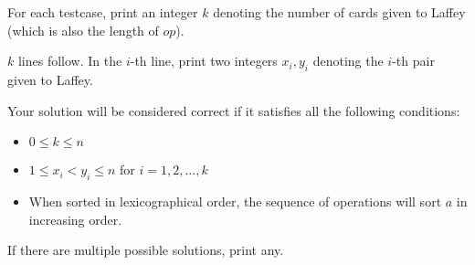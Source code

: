 For each testcase, print an integer $k$ denoting the number of cards given to Laffey (which is also the length of $op$).

$k$ lines follow.
In the $i$-th line, print two integers $x_i,y_i$ denoting the $i$-th pair given to Laffey.

Your solution will be considered correct if it satisfies all the following conditions:
\begin{itemize}
    \item $0 \leq k \leq n$
    \item $1 \leq x_i < y_i \leq n$ for $i = 1,2,\ldots,k$
    \item When sorted in lexicographical order, the sequence of operations will sort $a$ in increasing order.
\end{itemize}
If there are multiple possible solutions, print any.